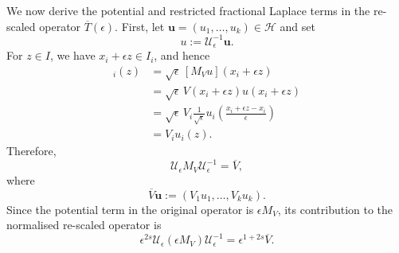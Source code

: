 \documentclass[preprint,12pt]{elsarticle}
\newcommand{\fvect}[1]{\mathbf{#1}}
\begin{document}
We now derive the potential and restricted fractional Laplace terms
in the re-scaled operator $\overline T(\epsilon)$. First, let
$\fvect{u}=(u_1,\ldots,u_k)\in\mathcal H$ and set
\[
    u:=\mathcal U_\epsilon^{-1}\fvect{u}.
\]
For $z\in I$, we have $x_i+\epsilon z\in I_i$, and hence
\begin{align*}
    [\mathcal U_\epsilon M_V
      \mathcal U_\epsilon^{-1}\fvect{u}]_i(z)
    &=
    \sqrt{\epsilon}\,
    [M_Vu](x_i+\epsilon z)\\
    &=
    \sqrt{\epsilon}\,
    V(x_i+\epsilon z)u(x_i+\epsilon z)\\
    &=
    \sqrt{\epsilon}\,
    V_i
    \frac{1}{\sqrt{\epsilon}}
    u_i\left(
        \frac{x_i+\epsilon z-x_i}{\epsilon}
    \right)\\
    &=
    V_i u_i(z).
\end{align*}
Therefore,
\[
    \mathcal U_\epsilon M_V\mathcal U_\epsilon^{-1}
    =
    \overline V,
\]
where
\[
    \overline V\fvect{u}
    :=
    (V_1u_1,\ldots,V_ku_k).
\]
Since the potential term in the original operator is $\epsilon M_V$,
its contribution to the normalised re-scaled operator is
\[
    \epsilon^{2s}
    \mathcal U_\epsilon(\epsilon M_V)
    \mathcal U_\epsilon^{-1}
    =
    \epsilon^{1+2s}\overline V.
\]
\end{document}
